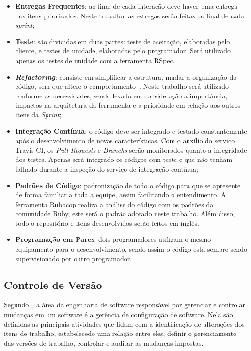 \begin{itemize}
  \item \textbf{Entregas Frequentes}: ao final de cada interação deve haver uma entrega
    dos itens priorizados. Neste trabalho, as estregas serão feitas ao final de
    cada \textit{sprint};
  \item \textbf{Teste}: são divididas em duas partes: teste de aceitação, elaboradas pelo cliente,
    e testes de unidade, elaboradas pelo programador. Será utilizado apenas os testes
    de unidade com a ferramenta RSpec.
  \item \textit{\textbf{Refactoring}}: consiste em simplificar a estrutura, mudar a organização do código,
    sem que altere o comportamento~\cite{beck:2000}. Neste trabalho será utilizado
    conforme as necessidades, sendo levado em consideração a import{\^a}ncia, impactos na
    arquitetura da ferramenta e a prioridade em relação aos outros itens da \textit{Sprint};
  \item \textbf{Integração Contínua}: o código deve ser integrado e testado constantemente
    após o desenvolvimento de novas características. Com o auxílio do serviço Travis CI,
    os \textit{Pull Requests} e \textit{Branchs} serão monitorados quanto a integridade dos testes. Apenas
    será integrado os códigos com teste e que não tenham falhado durante a
    inspeção do serviço de integração contínua;
  \item \textbf{Padrões de Código}: padronização de todo o código para que se apresente
    de forma familiar a toda a equipe, assim facilitando o entendimento. A ferramenta
    Rubocop realiza a análise do código com os padrões da comunidade Ruby, este será
    o padrão adotado neste trabalho. Além disso, todo o repositório e itens desenvolvidos
    serão feitos em inglês.
  \item \textbf{Programação em Pares}: dois programadores utilizam o mesmo equipamento para
    o desenvolvimento, sendo assim o código está sempre sendo supervisionado por
    outro programador.
\end{itemize}

\subsection{Controle de Versão}
\label{sec:ctrl_versao}

Segundo~, a área da engenharia de software responsável por
gerenciar e controlar mudanças em um software é a gerência de configuração de software.
Nela são definidas as principais atividades que lidam com a identificação de alterações
dos itens de trabalho, estabelecedo uma relação entre eles, definir o gerenciamento das
versões de trabalho, controlar e auditar as mudanças impostas.

